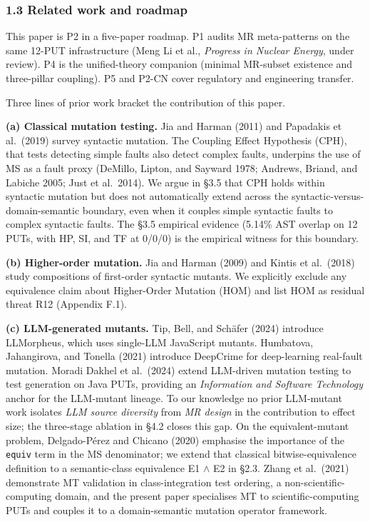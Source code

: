 \documentclass[review,12pt,authoryear]{elsarticle}
\begin{document}
\subsubsection{1.3 Related work and roadmap}\label{related-work-and-roadmap}

This paper is P2 in a five-paper roadmap. P1 audits MR meta-patterns on
the same 12-PUT infrastructure (Meng Li et al., \emph{Progress in
Nuclear Energy}, under review). P4 is the unified-theory companion
(minimal MR-subset existence and three-pillar coupling). P5 and P2-CN
cover regulatory and engineering transfer.

Three lines of prior work bracket the contribution of this paper.

\textbf{(a) Classical mutation testing.} Jia and Harman (2011) and
Papadakis et al.~(2019) survey syntactic mutation. The Coupling Effect
Hypothesis (CPH), that tests detecting simple faults also detect complex
faults, underpins the use of MS as a fault proxy (DeMillo, Lipton, and
Sayward 1978; Andrews, Briand, and Labiche 2005; Just et al.~2014). We
argue in §3.5 that CPH holds within syntactic mutation but does not
automatically extend across the syntactic-versus-domain-semantic
boundary, even when it couples simple syntactic faults to complex
syntactic faults. The §3.5 empirical evidence (5.14\% AST overlap on 12
PUTs, with HP, SI, and TF at 0/0/0) is the empirical witness for this
boundary.

\textbf{(b) Higher-order mutation.} Jia and Harman (2009) and Kintis et
al.~(2018) study compositions of first-order syntactic mutants. We
explicitly exclude any equivalence claim about Higher-Order Mutation
(HOM) and list HOM as residual threat R12 (Appendix F.1).

\textbf{(c) LLM-generated mutants.} Tip, Bell, and Schäfer (2024)
introduce LLMorpheus, which uses single-LLM JavaScript mutants.
Humbatova, Jahangirova, and Tonella (2021) introduce DeepCrime for
deep-learning real-fault mutation. Moradi Dakhel et al.~(2024) extend
LLM-driven mutation testing to test generation on Java PUTs, providing
an \emph{Information and Software Technology} anchor for the LLM-mutant
lineage. To our knowledge no prior LLM-mutant work isolates \emph{LLM
source diversity} from \emph{MR design} in the contribution to effect
size; the three-stage ablation in §4.2 closes this gap. On the
equivalent-mutant problem, Delgado-Pérez and Chicano (2020) emphasise
the importance of the \texttt{equiv} term in the MS denominator; we
extend that classical bitwise-equivalence definition to a semantic-class
equivalence E1 $\wedge$ E2 in §2.3. Zhang et al.~(2021) demonstrate MT
validation in class-integration test ordering, a
non-scientific-computing domain, and the present paper specialises MT to
scientific-computing PUTs and couples it to a domain-semantic mutation
operator framework.
\end{document}
